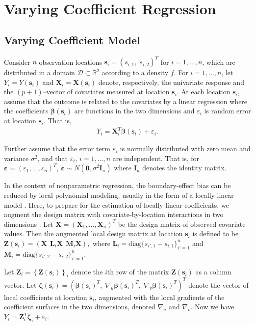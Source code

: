 \documentclass[authoryear,review, 12pt]{elsarticle}
\begin{document}
\section{Varying Coefficient Regression\label{sec:vcr}}

\subsection{Varying Coefficient Model}

Consider $n$ observation locations $\bm{s}_{i}=(s_{i,1},\; s_{i,2})^{T}$
for $i=1,\dots,n$, which are distributed in a domain $\mathcal{D}\subset\mathbb{R}^{2}$
according to a density $f$. For $i=1,\dots,n$, let $Y_{i}=Y(\bm{s}_{i})$
and $\bm{X}_{i}=\bm{X}(\bm{s}_{i})$ denote, respectively, the univariate
response and the $(p+1)$--vector of covariates measured at location
$\bm{s}_{i}$. At each location $\bm{s}_{i}$, assume that the outcome
is related to the covariates by a linear regression where the coefficients
$\bm{\beta}(\bm{s}_{i})$ are functions in the two dimensions and
$\varepsilon_{i}$ is random error at location $\bm{s}_{i}$. That
is, 
\begin{align}
Y_{i}=\bm{X}_{i}^{T}\bm{\beta}(\bm{s}_{i})+\varepsilon_{i}.\label{eq:lm(s)}
\end{align}

Further assume that the error term $\varepsilon_{i}$ is normally
distributed with zero mean and variance $\sigma^{2}$, and that $\varepsilon_{i}$,
$i=1,\dots,n$ are independent. That is, for $\bm{\varepsilon}=\left(\varepsilon_{1},\dots,\varepsilon_{n}\right)^{T}$,
$\bm{\varepsilon}\sim N\left(\bm{0},\sigma^{2}\bm{I}_{n}\right)$
where $\bm{I}_{n}$ denotes the identity matrix. 

In the context of nonparametric regression, the boundary-effect bias
can be reduced by local polynomial modeling, usually in the form of
a locally linear model \citep{Fan-Gijbels-1996}. Here, to prepare
for the estimation of locally linear coefficients, we augment the
design matrix with covariate-by-location interactions in two dimensions
\citep{Wang-2008b}. Let $\bm{X}=\left(\bm{X}_{1},\dots,\bm{X}_{n}\right)^{T}$
be the design matrix of observed covariate values. Then the augmented
local design matrix at location $\bm{s}_{i}$ is defined to be $\bm{Z}(\bm{s}_{i})=\left(\bm{X}\ \:\bm{L}_{i}\bm{X}\ \:\bm{M}_{i}\bm{X}\right),$
where $\bm{L}_{i}=\text{diag}\{s_{i',1}-s_{i,1}\}_{i'=1}^{n}$ and
$\bm{M}_{i}=\text{diag}\{s_{i',2}-s_{i,2}\}_{i'=1}^{n}$.

Let $\bm{Z}_{i}=\left\{ \bm{Z}(\bm{s}_{i})\right\} _{i}$ denote the
$i$th row of the matrix $\bm{Z}(\bm{s}_{i})$ as a column vector.
Let $\bm{\zeta}(\bm{s}_{i})=\left(\bm{\beta}(\bm{s}_{i})^{T},\;\nabla_{u}\bm{\beta}(\bm{s}_{i})^{T},\;\nabla_{v}\bm{\beta}(\bm{s}_{i})^{T}\right)^{T}$
denote the vector of local coefficients at location $\bm{s}_{i}$,
augmented with the local gradients of the coefficient surfaces in
the two dimensions, denoted $\nabla_{u}$ and $\nabla_{v}$. Now we
have $Y_{i}=\bm{Z}_{i}^{T}\bm{\zeta}_{i}+\varepsilon_{i}$.
\end{document}
